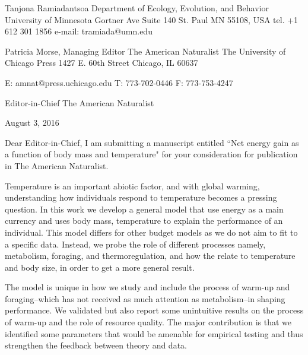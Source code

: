Tanjona Ramiadantsoa \newline
Department of Ecology, Evolution, and Behavior \newline
University of Minnesota  Gortner Ave Suite 140 \newline
St. Paul MN 55108, USA \newline
tel. +1 612 301 1856 \newline
e-mail: tramiada@umn.edu \newline


Patricia Morse, Managing Editor
The American Naturalist
The University of Chicago Press
1427 E. 60th Street
Chicago, IL 60637

E: amnat@press.uchicago.edu
T: 773-702-0446
F: 773-753-4247


Editor-in-Chief \newline
The American Naturalist  \newline \newline

August 3, 2016 \newline \newline

Dear Editor-in-Chief, \newline
I am submitting a manuscript entitled ``Net energy gain as a function of body mass and temperature" for your consideration for publication in The American Naturalist.

Temperature is an important abiotic factor, and with global warming, understanding how individuals respond to temperature becomes a pressing question.
In this work we develop a general model that use energy as a main currency and uses body mass, temperature to explain the performance of an individual.
This model differs for other budget models as we do not aim to fit to a specific data.
Instead, we probe the role of different processes namely, metabolism, foraging,  and thermoregulation, and how the relate to temperature and body size, in order to get a more general result.

The model is unique in how we study and include the process of warm-up and foraging--which has not received as much attention as metabolism--in shaping performance.
We validated but also report some unintuitive results on the process of warm-up and the role of resource quality.
The major contribution is that we identified some parameters that would be amenable for empirical testing and thus strengthen the feedback between theory and data.

